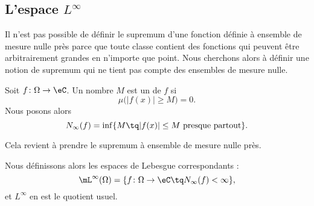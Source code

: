 \subsection{L'espace \texorpdfstring{\(  L^{\infty}\)}{Linfinity}}
\label{SUBSECooYFJTooBqrLXv}

Il n'est pas possible de définir le supremum d'une fonction définie à ensemble de mesure nulle près parce que toute classe contient des fonctions qui peuvent être arbitrairement grandes en n'importe que point. Nous cherchons alors à définir une notion de supremum qui ne tient pas compte des ensembles de mesure nulle.
\begin{definition}      \label{DEFooIQOOooLpJBqi}
	Soit \( f\colon \Omega\to \eC\). Un nombre \( M\) est un  de \( f\) si
	\begin{equation}
		\mu\big( | f(x) |\geq M \big)=0.
	\end{equation}
	Nous posons alors
	\begin{equation}
		N_{\infty}(f)=\inf\{ M\tq | f(x) |\leq M\text{ presque partout} \}.
	\end{equation}
\end{definition}
Cela revient à prendre le supremum à ensemble de mesure nulle près.

\begin{definition}      \label{DEFooXUKHooXYrlYq}
	Nous définissons alors les espaces de Lebesgue correspondants :
	\begin{equation}
		\mL^{\infty}(\Omega)=\{ f\colon \Omega\to \eC\tq N_{\infty}(f)<\infty \},
	\end{equation}
	et \( L^{\infty}\) en est le quotient usuel.
\end{definition}

